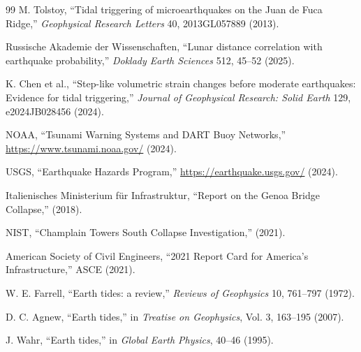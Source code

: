 \documentclass[12pt,a4paper]{article}
\theoremstyle{remark}
\begin{document}
\begin{thebibliography}{99}
		M. Tolstoy, ``Tidal triggering of microearthquakes on the Juan de Fuca Ridge,'' \emph{Geophysical Research Letters} 40, 2013GL057889 (2013).
		
		Russische Akademie der Wissenschaften, ``Lunar distance correlation with earthquake probability,'' \emph{Doklady Earth Sciences} 512, 45–52 (2025).
		
		K. Chen et al., ``Step-like volumetric strain changes before moderate earthquakes: Evidence for tidal triggering,'' \emph{Journal of Geophysical Research: Solid Earth} 129, e2024JB028456 (2024).
		
		NOAA, ``Tsunami Warning Systems and DART Buoy Networks,'' \url{https://www.tsunami.noaa.gov/} (2024).
		
		USGS, ``Earthquake Hazards Program,'' \url{https://earthquake.usgs.gov/} (2024).
		
		Italienisches Ministerium für Infrastruktur, ``Report on the Genoa Bridge Collapse,'' (2018).
		
		NIST, ``Champlain Towers South Collapse Investigation,'' (2021).
		
		American Society of Civil Engineers, ``2021 Report Card for America's Infrastructure,'' ASCE (2021).
		
		W. E. Farrell, ``Earth tides: a review,'' \emph{Reviews of Geophysics} 10, 761–797 (1972).
		
		D. C. Agnew, ``Earth tides,'' in \emph{Treatise on Geophysics}, Vol. 3, 163–195 (2007).
		
		J. Wahr, ``Earth tides,'' in \emph{Global Earth Physics}, 40–46 (1995).
		
	\end{thebibliography}	
\end{document}
